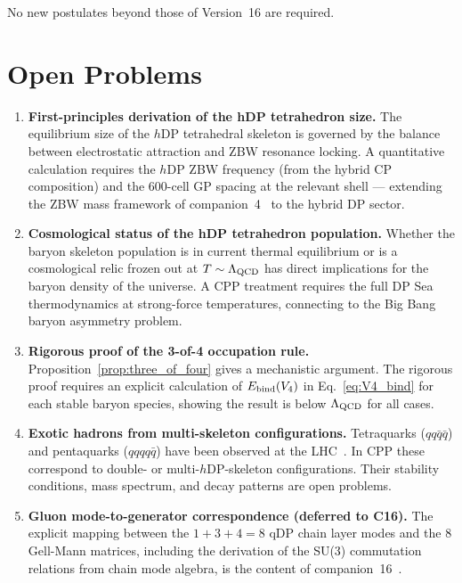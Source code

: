 \documentclass[12pt]{article}
\newcommand{\hDP}{h\mathrm{DP}}
\begin{document}
No new postulates beyond those of Version~16 are required.

\section{Open Problems}
\label{sec:open}

\begin{enumerate}
\item \label{op:hdp_size}
  \textbf{First-principles derivation of the hDP tetrahedron size.}
  The equilibrium size of the $\hDP$ tetrahedral skeleton is governed
  by the balance between electrostatic attraction and ZBW resonance
  locking.  A quantitative calculation requires the $\hDP$ ZBW
  frequency (from the hybrid CP composition) and the 600-cell GP
  spacing at the relevant shell --- extending the ZBW mass framework
  of companion~4~\cite{c4} to the hybrid DP sector.

\item \textbf{Cosmological status of the hDP tetrahedron population.}
  Whether the baryon skeleton population is in current thermal
  equilibrium or is a cosmological relic frozen out at
  $T \sim \Lambda_{\rm QCD}$ has direct implications for the baryon
  density of the universe.  A CPP treatment requires the full DP Sea
  thermodynamics at strong-force temperatures, connecting to the
  Big Bang baryon asymmetry problem.

\item \label{op:fourth_vertex}
  \textbf{Rigorous proof of the 3-of-4 occupation rule.}
  Proposition~\ref{prop:three_of_four} gives a mechanistic argument.
  The rigorous proof requires an explicit calculation of
  $E_{\rm bind}(V_4)$ in Eq.~\eqref{eq:V4_bind} for each stable
  baryon species, showing the result is below $\Lambda_{\rm QCD}$
  for all cases.

\item \label{op:exotic}
  \textbf{Exotic hadrons from multi-skeleton configurations.}
  Tetraquarks ($qq\bar{q}\bar{q}$) and pentaquarks ($qqqq\bar{q}$)
  have been observed at the LHC~\cite{pdg2022}.  In CPP these
  correspond to double- or multi-$\hDP$-skeleton configurations.
  Their stability conditions, mass spectrum, and decay patterns
  are open problems.

\item \textbf{Gluon mode-to-generator correspondence (deferred to C16).}
  The explicit mapping between the $1+3+4 = 8$ qDP chain layer modes
  and the 8 Gell-Mann matrices, including the derivation of the
  SU(3) commutation relations from chain mode algebra, is the
  content of companion~16~\cite{c16}.


\end{enumerate}
\end{document}
